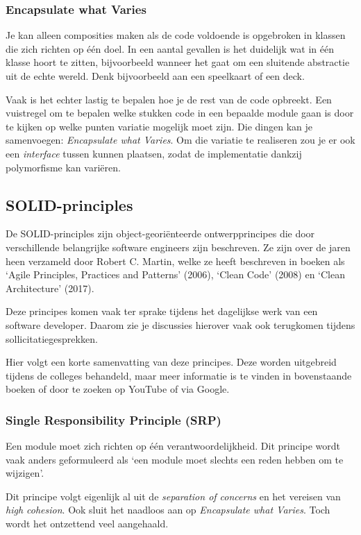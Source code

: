 \subsubsection{Encapsulate what Varies}
Je kan alleen composities maken als de code voldoende is opgebroken
in klassen die zich richten op één doel. In een aantal gevallen 
is het duidelijk wat in één klasse hoort te zitten, bijvoorbeeld
wanneer het gaat om een sluitende abstractie uit de echte wereld.
Denk bijvoorbeeld aan een speelkaart of een deck.

Vaak is het echter lastig te bepalen hoe je de rest van de code opbreekt. 
Een vuistregel om te bepalen welke stukken code in een bepaalde module gaan 
is door te kijken op welke punten variatie mogelijk moet zijn. Die dingen 
kan je samenvoegen: \textit{Encapsulate what Varies}. Om die variatie 
te realiseren zou je er ook een \textit{interface} tussen kunnen plaatsen,
zodat de implementatie dankzij polymorfisme kan variëren.

\subsection{SOLID-principles}
De SOLID-principles zijn object-georiënteerde ontwerpprincipes die door 
verschillende belangrijke software engineers zijn beschreven.
Ze zijn over de jaren heen verzameld door Robert C. Martin, 
welke ze heeft beschreven in boeken als 
`Agile Principles, Practices and Patterns' (2006), 
`Clean Code' (2008) en `Clean Architecture' (2017).

Deze principes komen vaak ter sprake tijdens het 
dagelijkse werk van een software developer. Daarom zie 
je discussies hierover vaak ook terugkomen tijdens 
sollicitatiegesprekken.

Hier volgt een korte samenvatting van deze principes.
Deze worden uitgebreid tijdens de colleges behandeld,
maar meer informatie is te vinden in bovenstaande boeken 
of door te zoeken op YouTube of via Google.

\subsubsection{Single Responsibility Principle (SRP)}
Een module moet zich richten op één verantwoordelijkheid.
Dit principe wordt vaak anders geformuleerd als 
`een module moet slechts een reden hebben om te wijzigen'.

Dit principe volgt eigenlijk al uit de \textit{separation of concerns}
en het vereisen van \textit{high cohesion}. Ook sluit het naadloos aan 
op \textit{Encapsulate what Varies}. Toch wordt het ontzettend
veel aangehaald.

